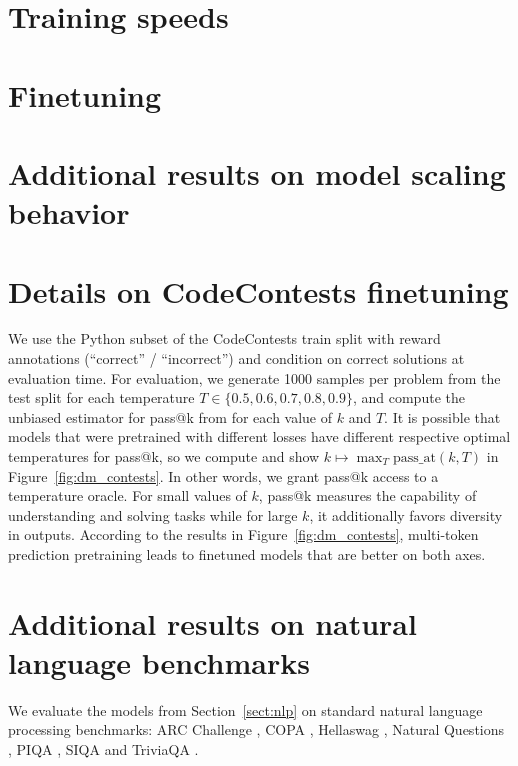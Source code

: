 

\newpage
\section{Training speeds}


\section{Finetuning}


\newpage
\section{Additional results on model scaling behavior}
\label{app:model-scaling}


\section{Details on CodeContests finetuning}
\label{app:finetuning}
We use the Python subset of the CodeContests \citep{li2022competition} train split with reward annotations (``correct'' / ``incorrect'') and condition on correct solutions at evaluation time. For evaluation, we generate 1000 samples per problem from the test split for each temperature $T \in \{0.5, 0.6, 0.7, 0.8, 0.9\}$, and compute the unbiased estimator for pass@k  from \citet{chen2021evaluating} for each value of $k$ and $T$. It is possible that models that were pretrained with different losses have different respective optimal temperatures for pass@k, so we compute and show $k \mapsto \max_T \mathrm{pass\_at}(k, T)$ in Figure~\ref{fig:dm_contests}. In other words, we grant pass@k access to a temperature oracle. For small values of $k$, pass@k measures the capability of understanding and solving tasks while for large $k$, it additionally favors diversity in outputs. According to the results in Figure~\ref{fig:dm_contests}, multi-token prediction pretraining leads to finetuned models that are better on both axes.

\newpage
\section{Additional results on natural language benchmarks}
\label{app:choice_nlp}
We evaluate the models from Section~\ref{sect:nlp} on standard natural language processing benchmarks: ARC Challenge \citep{yadav2019quick}, COPA \citep{roemmele2011choice}, Hellaswag \citep{zellers2019hellaswag}, Natural Questions \citep{kwiatkowski2019natural}, PIQA \citep{bisk2019piqa}, SIQA \citep{sap2019socialiqa} and TriviaQA \citep{joshi2017triviaqa}.

